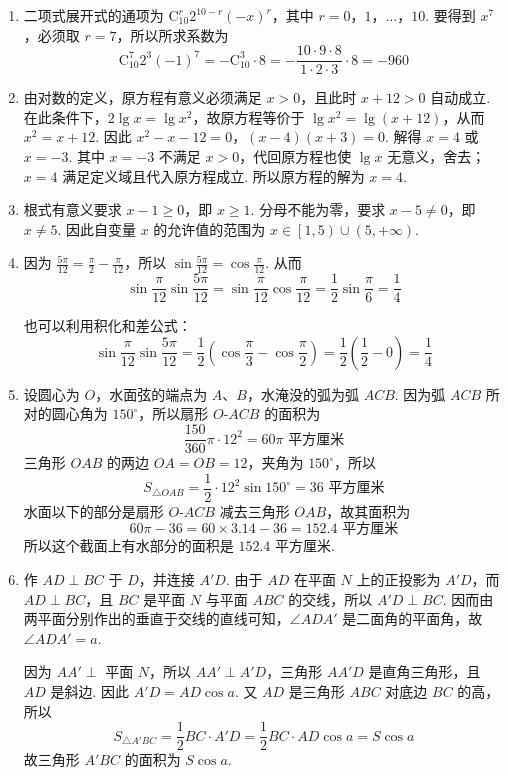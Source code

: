 \documentclass[UTF8,a4paper,oneside,11pt]{ctexbook}
\begin{document}
\begin{solution}
\begin{enumerate}
\item 二项式展开式的通项为 \(\mathrm C_{10}^{r}2^{10-r}(-x)^r\)，其中 \(r=0\)，\(1\)，\(\ldots\)，\(10\). 要得到 \(x^7\)，必须取 \(r=7\)，所以所求系数为
\[
\mathrm C_{10}^{7}2^3(-1)^7=-\mathrm C_{10}^{3}\cdot8=-\frac{10\cdot9\cdot8}{1\cdot2\cdot3}\cdot8=-960
\]

\item 由对数的定义，原方程有意义必须满足 \(x>0\)，且此时 \(x+12>0\) 自动成立. 在此条件下，\(2\lg x=\lg x^2\)，故原方程等价于 \(\lg x^2=\lg\left(x+12\right)\)，从而 \(x^2=x+12\). 因此
\(x^2-x-12=0\)，\(\left(x-4\right)\left(x+3\right)=0\).
解得 \(x=4\) 或 \(x=-3\). 其中 \(x=-3\) 不满足 \(x>0\)，代回原方程也使 \(\lg x\) 无意义，舍去；\(x=4\) 满足定义域且代入原方程成立. 所以原方程的解为 \(x=4\).

\item 根式有意义要求 \(x-1\geq0\)，即 \(x\geq1\). 分母不能为零，要求 \(x-5\neq0\)，即 \(x\neq5\). 因此自变量 \(x\) 的允许值的范围为 \(x\in\left[1,5\right)\cup\left(5,+\infty\right)\).

\item 因为 \(\frac{5\pi}{12}=\frac{\pi}{2}-\frac{\pi}{12}\)，所以 \(\sin\frac{5\pi}{12}=\cos\frac{\pi}{12}\). 从而
\[
\sin\frac{\pi}{12}\sin\frac{5\pi}{12}=\sin\frac{\pi}{12}\cos\frac{\pi}{12}=\frac{1}{2}\sin\frac{\pi}{6}=\frac{1}{4}
\]

也可以利用积化和差公式：
\[
\sin\frac{\pi}{12}\sin\frac{5\pi}{12}=\frac{1}{2}\left(\cos\frac{\pi}{3}-\cos\frac{\pi}{2}\right)=\frac{1}{2}\left(\frac{1}{2}-0\right)=\frac{1}{4}
\]

\item 设圆心为 \(O\)，水面弦的端点为 \(A\)、\(B\)，水淹没的弧为弧 \(ACB\). 因为弧 \(ACB\) 所对的圆心角为 \(150^\circ\)，所以扇形 \(O\text{-}ACB\) 的面积为
\[
\frac{150}{360}\pi\cdot12^2=60\pi\text{ 平方厘米}
\]
三角形 \(OAB\) 的两边 \(OA=OB=12\)，夹角为 \(150^\circ\)，所以
\[
S_{\triangle OAB}=\frac{1}{2}\cdot12^2\sin150^\circ=36\text{ 平方厘米}
\]
水面以下的部分是扇形 \(O\text{-}ACB\) 减去三角形 \(OAB\)，故其面积为
\[
60\pi-36=60\times3.14-36=152.4\text{ 平方厘米}
\]
所以这个截面上有水部分的面积是 \(152.4\text{ 平方厘米}\).

\item 作 \(AD\perp BC\) 于 \(D\)，并连接 \(A'D\). 由于 \(AD\) 在平面 \(N\) 上的正投影为 \(A'D\)，而 \(AD\perp BC\)，且 \(BC\) 是平面 \(N\) 与平面 \(ABC\) 的交线，所以 \(A'D\perp BC\). 因而由两平面分别作出的垂直于交线的直线可知，\(\angle ADA'\) 是二面角的平面角，故 \(\angle ADA'=a\).


因为 \(AA'\perp\) 平面 \(N\)，所以 \(AA'\perp A'D\)，三角形 \(AA'D\) 是直角三角形，且 \(AD\) 是斜边. 因此 \(A'D=AD\cos a\). 又 \(AD\) 是三角形 \(ABC\) 对底边 \(BC\) 的高，所以
\[
S_{\triangle A'BC}=\frac{1}{2}BC\cdot A'D=\frac{1}{2}BC\cdot AD\cos a=S\cos a
\]
故三角形 \(A'BC\) 的面积为 \(S\cos a\).
\end{enumerate}
\end{solution}
\end{document}
